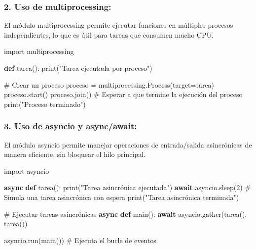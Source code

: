 \documentclass[
  a4paper,
  DIV=11,
  numbers=noendperiod,
  onepage,
  openany]{scrreprt}
\newenvironment{Shaded}{\begin{snugshade}}{\end{snugshade}}
\newcommand{\BuiltInTok}[1]{\textcolor[rgb]{0.00,0.23,0.31}{#1}}
\newcommand{\CommentTok}[1]{\textcolor[rgb]{0.37,0.37,0.37}{#1}}
\newcommand{\ControlFlowTok}[1]{\textcolor[rgb]{0.00,0.23,0.31}{\textbf{#1}}}
\newcommand{\DecValTok}[1]{\textcolor[rgb]{0.68,0.00,0.00}{#1}}
\newcommand{\ImportTok}[1]{\textcolor[rgb]{0.00,0.46,0.62}{#1}}
\newcommand{\KeywordTok}[1]{\textcolor[rgb]{0.00,0.23,0.31}{\textbf{#1}}}
\newcommand{\NormalTok}[1]{\textcolor[rgb]{0.00,0.23,0.31}{#1}}
\newcommand{\OperatorTok}[1]{\textcolor[rgb]{0.37,0.37,0.37}{#1}}
\newcommand{\StringTok}[1]{\textcolor[rgb]{0.13,0.47,0.30}{#1}}
\begin{document}
\subsubsection{2. Uso de multiprocessing:}\label{uso-de-multiprocessing}

El módulo multiprocessing permite ejecutar funciones en múltiples
procesos independientes, lo que es útil para tareas que consumen mucho
CPU.

\begin{Shaded}
\begin{Highlighting}[]
\ImportTok{import}\NormalTok{ multiprocessing}

\KeywordTok{def}\NormalTok{ tarea():}
    \BuiltInTok{print}\NormalTok{(}\StringTok{"Tarea ejecutada por proceso"}\NormalTok{)}

\CommentTok{\# Crear un proceso}
\NormalTok{proceso }\OperatorTok{=}\NormalTok{ multiprocessing.Process(target}\OperatorTok{=}\NormalTok{tarea)}
\NormalTok{proceso.start()}
\NormalTok{proceso.join()  }\CommentTok{\# Esperar a que termine la ejecución del proceso}
\BuiltInTok{print}\NormalTok{(}\StringTok{"Proceso terminado"}\NormalTok{)}
\end{Highlighting}
\end{Shaded}

\subsubsection{3. Uso de asyncio y
async/await:}\label{uso-de-asyncio-y-asyncawait}

El módulo asyncio permite manejar operaciones de entrada/salida
asincrónicas de manera eficiente, sin bloquear el hilo principal.

\begin{Shaded}
\begin{Highlighting}[]
\ImportTok{import}\NormalTok{ asyncio}

\ControlFlowTok{async} \KeywordTok{def}\NormalTok{ tarea():}
    \BuiltInTok{print}\NormalTok{(}\StringTok{"Tarea asincrónica ejecutada"}\NormalTok{)}
    \ControlFlowTok{await}\NormalTok{ asyncio.sleep(}\DecValTok{2}\NormalTok{)  }\CommentTok{\# Simula una tarea asincrónica con espera}
    \BuiltInTok{print}\NormalTok{(}\StringTok{"Tarea asincrónica terminada"}\NormalTok{)}

\CommentTok{\# Ejecutar tareas asincrónicas}
\ControlFlowTok{async} \KeywordTok{def}\NormalTok{ main():}
    \ControlFlowTok{await}\NormalTok{ asyncio.gather(tarea(), tarea())}

\NormalTok{asyncio.run(main())  }\CommentTok{\# Ejecuta el bucle de eventos}
\end{Highlighting}
\end{Shaded}
\end{document}
